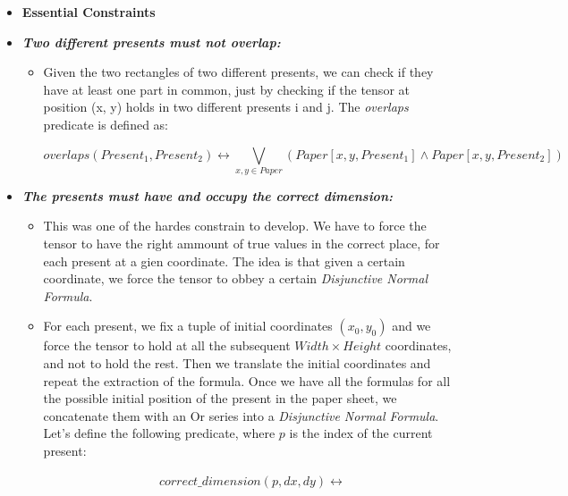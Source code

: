 \begin{itemize}
    \item[] \textbf{Essential Constraints}
    \item \textbf{\textit{Two different presents must not overlap:}}
    \begin{itemize}
        \item[] Given the two rectangles of two different presents, we can check if they have
            at least one part in common, just by checking if the tensor at position (x, y)
            holds in two different presents i and j. The \textit{overlaps} predicate is defined as:
        \begin{adjustwidth}{-2.5cm}{}\begin{equation*}
            overlaps(Present_1, Present_2) \leftrightarrow
            \bigvee_{x, y \in Paper}(Paper[x, y, Present_1] \wedge Paper[x, y, Present_2])
        \end{equation*}\end{adjustwidth}
    \end{itemize}
    \newpage
    \item \textbf{\textit{The presents must have and occupy the correct dimension:}}
    \begin{itemize}
        \item[] This was one of the hardes constrain to develop. We have to force the tensor to have the right
            ammount of true values in the correct place, for each present at a gien coordinate. The idea is
            that given a certain coordinate, we force the tensor to obbey a certain \textit{Disjunctive Normal Formula}.
        \item[] For each present, we fix a tuple of initial coordinates $(x_0, y_0)$ and we force the tensor to hold at 
                all the subsequent $Width \times Height$ coordinates, and not to hold the rest.
                Then we translate the initial coordinates and repeat the extraction of the formula.
                Once we have all the formulas for all the possible initial position of the present in the paper sheet,
                we concatenate them with an Or series into a \textit{Disjunctive Normal Formula}.
                Let's define the following predicate, where $p$ is the index of the current present:
        \begin{adjustwidth}{-2.0cm}{}\begin{equation*}\begin{split}
            &correct\_dimension(p, dx, dy) \leftrightarrow \\

\end{split}
\end{equation*}
\end{adjustwidth}
\end{itemize}
\end{itemize}
